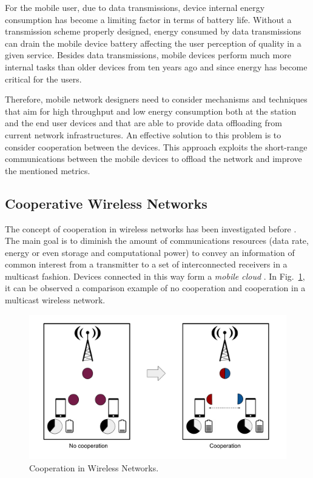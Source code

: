 For the mobile user, due to data transmissions, device internal energy consumption has become a limiting factor in terms of battery life. Without a transmission scheme properly designed, energy consumed by data transmissions can drain the mobile device battery affecting the user perception of quality in a given service. Besides data transmissions, mobile devices perform much more internal tasks than older devices from ten years ago and since energy has become critical for the users.

Therefore, mobile network designers need to consider mechanisms and techniques that aim for high throughput and low energy consumption both at the station and the end user devices and that are able to provide data offloading from current network infrastructures. An effective solution to this problem is to consider cooperation between the devices. This approach exploits the short-range communications between the mobile devices to offload the network and improve the mentioned metrics.

\subsection{Cooperative Wireless Networks}
The concept of cooperation in wireless networks has been investigated before \cite{fitzek2006cooperation,fitzek2007cognitive,fitzek2013mobile}. The main goal is to diminish the amount of communications resources (data rate, energy or even storage and computational power) to convey an information of common interest from a transmitter to a set of interconnected receivers in a multicast fashion. Devices connected in this way form a \textit{mobile cloud} \cite{fitzek2013mobile}. In Fig.~\ref{fig:cooperation}, it can be observed a comparison example of no cooperation and cooperation in a multicast wireless network.

\begin{figure}[ht!]
  \centering
  \includegraphics[width=\textwidth]{introduction/figures/cooperation.pdf}
  \caption{Cooperation in Wireless Networks.}
\label{fig:cooperation}
\end{figure}

